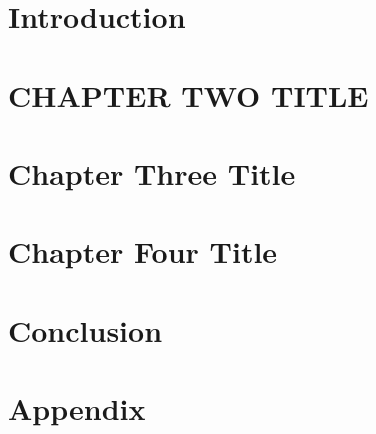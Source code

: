 \mainmatter %

\chapter{Introduction}
 
\chapter{CHAPTER TWO TITLE}
 
\chapter{Chapter Three Title}
 
\chapter{Chapter Four Title}
 
\chapter{Conclusion}


\appendix %

\chapter{Appendix}

